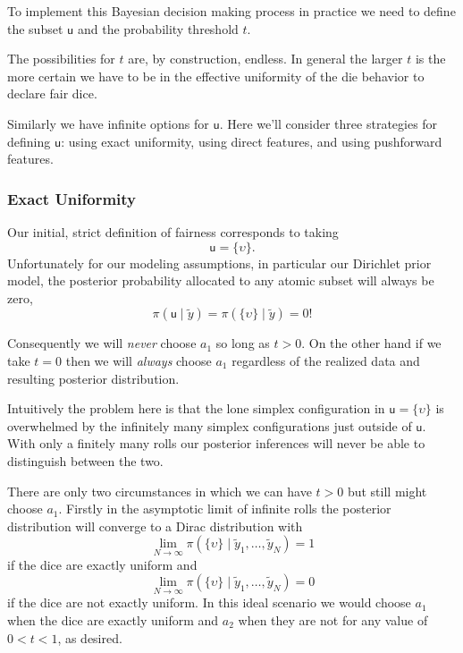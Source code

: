 \documentclass[
  letterpaper,
  DIV=11,
  numbers=noendperiod]{scrartcl}
\begin{document}
To implement this Bayesian decision making process in practice we need
to define the subset \(\mathsf{u}\) and the probability threshold \(t\).

The possibilities for \(t\) are, by construction, endless. In general
the larger \(t\) is the more certain we have to be in the effective
uniformity of the die behavior to declare fair dice.

Similarly we have infinite options for \(\mathsf{u}\). Here we'll
consider three strategies for defining \(\mathsf{u}\): using exact
uniformity, using direct features, and using pushforward features.

\subsubsection{Exact Uniformity}\label{exact-uniformity}

Our initial, strict definition of fairness corresponds to taking \[
\mathsf{u} = \{ \upsilon \}.
\] Unfortunately for our modeling assumptions, in particular our
Dirichlet prior model, the posterior probability allocated to any atomic
subset will always be zero, \[
\pi( \mathsf{u} \mid \tilde{y} ) = \pi( \{ \upsilon \} \mid \tilde{y} ) = 0!
\]

Consequently we will \emph{never} choose \(a_{1}\) so long as \(t > 0\).
On the other hand if we take \(t = 0\) then we will \emph{always} choose
\(a_{1}\) regardless of the realized data and resulting posterior
distribution.

Intuitively the problem here is that the lone simplex configuration in
\(\mathsf{u} = \{ \upsilon \}\) is overwhelmed by the infinitely many
simplex configurations just outside of \(\mathsf{u}\). With only a
finitely many rolls our posterior inferences will never be able to
distinguish between the two.

There are only two circumstances in which we can have \(t > 0\) but
still might choose \(a_{1}\). Firstly in the asymptotic limit of
infinite rolls the posterior distribution will converge to a Dirac
distribution with \[
\lim_{N \rightarrow \infty}
\pi( \{ \upsilon \} \mid \tilde{y}_{1}, \ldots, \tilde{y}_{N}) = 1
\] if the dice are exactly uniform and \[
\lim_{N \rightarrow \infty}
\pi( \{ \upsilon \} \mid \tilde{y}_{1}, \ldots, \tilde{y}_{N}) = 0
\] if the dice are not exactly uniform. In this ideal scenario we would
choose \(a_{1}\) when the dice are exactly uniform and \(a_{2}\) when
they are not for any value of \(0 < t < 1\), as desired.
\end{document}
